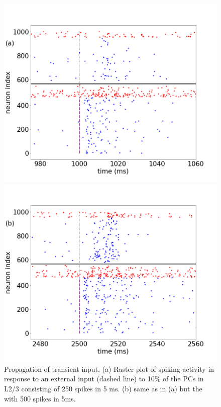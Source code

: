 \begin{figure}[H]
    \centering
    \begin{minipage}[b]{0.45\textwidth}
    \includegraphics[scale=0.23]{Figures/Fig13a.png}
    \end{minipage}
    \hfill
    \begin{minipage}[b]{0.5\textwidth}
        \includegraphics[scale=0.23]{Figures/Fig13b.png}
    \end{minipage}
    \caption{Propagation of transient input. (a) Raster plot of spiking activity in response to an external input (dashed line) to 10\% of the PCs in L2/3 consisting of 250 spikes in 5 ms. (b) same as in (a) but the with 500 spikes in 5ms.}
    \label{fig:fig13}
\end{figure}

